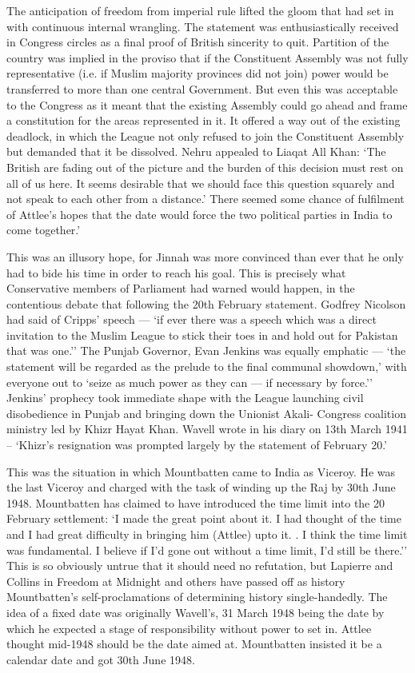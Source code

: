 The anticipation of freedom from imperial rule lifted the gloom that had set in with continuous internal wrangling. The statement was enthusiastically received in Congress circles as a final proof of British sincerity to quit. Partition of the country was implied in the proviso that if the Constituent Assembly was not fully representative (i.e. if Muslim majority provinces did not join) power would be transferred to more than one central Government. But even this was acceptable to the Congress as it meant that the existing Assembly could go ahead and frame a constitution for the areas represented in it. It offered a way out of the existing deadlock, in which the League not only refused to join the Constituent Assembly but demanded that it be dissolved. Nehru appealed to Liaqat All Khan: `The British are fading out of the picture and the burden of this decision must rest on all of us here. It seems desirable that we should face this question squarely and not speak to each other from a distance.' There seemed some chance of fulfilment of Attlee's hopes that the date would force the two political parties in India to come together.' 

This was an illusory hope, for Jinnah was more convinced than ever that he only had to bide his time in order to reach his goal. This is precisely what Conservative members of Parliament had warned would happen, in the contentious debate that following the 20th February statement. Godfrey Nicolson had said of Cripps' speech --- `if ever there was a speech which was a direct invitation to the Muslim League to stick their toes in and hold out for Pakistan that was one.'' The Punjab Governor, Evan Jenkins was equally emphatic --- `the statement will be regarded as the prelude to the final communal showdown,' with everyone out to `seize as much power as they can --- if necessary by force.'' Jenkins' prophecy took immediate shape with the League launching civil disobedience in Punjab and bringing down the Unionist Akali- Congress coalition ministry led by Khizr Hayat Khan. Wavell wrote in his diary on 13th March 1941 -- `Khizr's resignation was prompted largely by the statement of February 20.' 

This was the situation in which Mountbatten came to India as Viceroy. He was the last Viceroy and charged with the task of winding up the Raj by 30th June 1948. Mountbatten has claimed to have introduced the time limit into the 20 February settlement: `I made the great point about it. I had thought of the time and I had great difficulty in bringing him (Attlee) upto it. . I think the time limit was fundamental. I believe if I'd gone out without a time limit, I'd still be there.'' This is so obviously untrue that it should need no refutation, but Lapierre and Collins in Freedom at Midnight and others have passed off as history Mountbatten's self-proclamations of determining history single-handedly. The idea of a fixed date was originally Wavell's, 31 March 1948 being the date by which he expected a stage of responsibility without power to set in. Attlee thought mid-1948 should be the date aimed at. Mountbatten insisted it be a calendar date and got 30th June 1948. 

